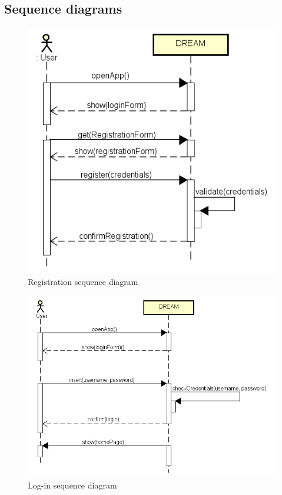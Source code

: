 \subsection{Sequence diagrams}
\begin{figure}[H]
    \centering
    \includegraphics[scale=0.7]{Images/RegistrationSequence.png}
    \caption{Registration sequence diagram}
\end{figure}

\bigskip
\begin{figure}[H]
    \centering
    \includegraphics[scale=0.7]{Images/login.png}
    \caption{Log-in sequence diagram}
\end{figure}

